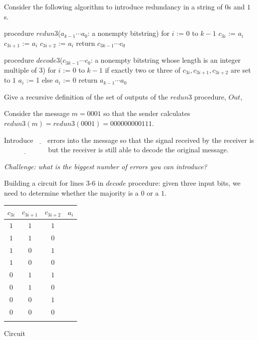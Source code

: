 \documentclass[12pt, oneside]{article}
\begin{document}
Consider the following algorithm to introduce redundancy in a string of $0$s and $1$s.
\begin{algorithm}[caption={Create redundancy by repeating each bit three times}]
procedure $\textit{redun3}$($a_{k-1} \cdots a_0$: a nonempty bitstring)
for $i$ := $0$ to $k-1$
  $c_{3i}$ := $a_i$
  $c_{3i+1}$ := $a_i$
  $c_{3i+2}$ := $a_i$
return $c_{3k-1} \cdots c_0$
\end{algorithm}

\begin{algorithm}[caption={Decode sequence of bits using majority rule on consecutive three bit sequences}]
procedure $\textit{decode3}$($c_{3k-1} \cdots c_0$: a nonempty bitstring whose length is an integer multiple of $3$)
for $i$ := $0$ to $k-1$
  if exactly two or three of $c_{3i}, c_{3i+1}, c_{3i+2}$ are set to $1$
    $a_i$ := 1
  else 
    $a_i$ := 0
return $a_{k-1} \cdots a_0$
\end{algorithm}

Give a recursive definition of the set of outputs of the $redun3$ procedure, $Out$,



Consider the message $m = 0001$ so that the sender calculates $redun3(m) = redun3(0001) = 000000000111$.

Introduce $\underline{\phantom{~~4~~}} $
errors into the message so that the signal received by the 
receiver is $\underline{\phantom{010100010101}}$
but the receiver is still able to decode the original message.


{\it Challenge: what is the biggest number of errors you can introduce?} 

Building a circuit for lines 3-6 in $decode$ procedure: given three input bits, we need to determine whether the
majority is a $0$ or a $1$.

\begin{center}
\begin{multicols}{2}\begin{tabular}{ccc|c}
$c_{3i}$ & $c_{3i+1}$ & $c_{3i+2}$ & $a_i$ \\
\hline
$1$ & $1$ & $1$ & $\phantom{1}$ \\
$1$ & $1$ & $0$ & $\phantom{1}$ \\
$1$ & $0$ & $1$ & $\phantom{1}$ \\
$1$ & $0$ & $0$ & $\phantom{0}$ \\
$0$ & $1$ & $1$ & $\phantom{1}$ \\
$0$ & $1$ & $0$ & $\phantom{0}$ \\
$0$ & $0$ & $1$ & $\phantom{0}$ \\
$0$ & $0$ & $0$ & $\phantom{0}$ \\\\
\end{tabular}
\columnbreak

Circuit 
\end{multicols}
\end{center} \vfill
\end{document}
